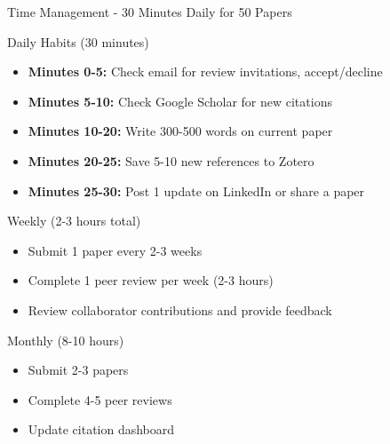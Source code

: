\documentclass[11pt]{beamer}
\begin{document}
	\begin{frame}{Time Management - 30 Minutes Daily for 50 Papers}
		\scriptsize
		\begin{block}{Daily Habits (30 minutes)}
			\begin{itemize}
				\item \textbf{Minutes 0-5:} Check email for review invitations, accept/decline
				\item \textbf{Minutes 5-10:} Check Google Scholar for new citations
				\item \textbf{Minutes 10-20:} Write 300-500 words on current paper
				\item \textbf{Minutes 20-25:} Save 5-10 new references to Zotero
				\item \textbf{Minutes 25-30:} Post 1 update on LinkedIn or share a paper
			\end{itemize}
		\end{block}
		\begin{block}{Weekly (2-3 hours total)}
			\begin{itemize}
				\item Submit 1 paper every 2-3 weeks
				\item Complete 1 peer review per week (2-3 hours)
				\item Review collaborator contributions and provide feedback
			\end{itemize}
		\end{block}
		\begin{block}{Monthly (8-10 hours)}
			\begin{itemize}
				\item Submit 2-3 papers
				\item Complete 4-5 peer reviews
				\item Update citation dashboard
			\end{itemize}
		\end{block}
	\end{frame}
	
\end{document}
